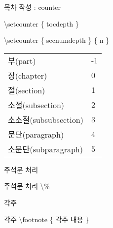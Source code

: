 \documentclass[ aspectratio=149,  10pt,blue,xcolor=pdftex,dvipsnames,table,handout,notes]{beamer}
\begin{document}
		\begin{frame}[t]{목차 작성 : counter}

			\begin{block} {\textbackslash setcounter \{ tocdepth \} }
			\end{block}

			\begin{block} {\textbackslash setcounter \{ secnumdepth \} \{ n \} }
			\end{block}


			\begin{center}
			\begin{table}
			\begin{tabular}{ l l }
				\hline
				부(part)				&-1\\
				장(chapter)			&0\\
				절(section)			&1\\
				소절(subsection)		&2\\
				소소절(subsubsection)	&3\\
				문단(paragraph)		&4\\
				소문단(subparagraph)	&5\\
				\hline
			\end{tabular}
			\end{table}
			\end{center}


		\note[item]{}
		\end{frame}



		\begin{frame}[t]{주석문 처리}

			\begin{block} {주석문 처리}
			\textbackslash \%
			\end{block}

		\note[item]{}
		\end{frame}



		\begin{frame}[t]{각주}

			\begin{block} {각주}
			\textbackslash footnote \{ 각주 내용 \}
			\end{block}


		\note[item]{}
		\end{frame}
\end{document}
